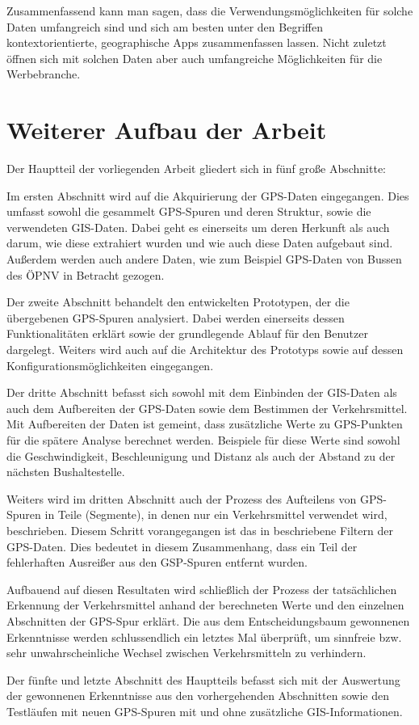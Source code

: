 Zusammenfassend kann man sagen, dass die Verwendungsmöglichkeiten für solche Daten umfangreich sind und sich am besten unter den Begriffen kontextorientierte, geographische Apps zusammenfassen lassen. Nicht zuletzt öffnen sich mit solchen Daten aber auch umfangreiche Möglichkeiten für die Werbebranche.

\section{Weiterer Aufbau der Arbeit}
Der Hauptteil der vorliegenden Arbeit gliedert sich in fünf große Abschnitte:

Im ersten Abschnitt wird auf die Akquirierung der GPS-Daten eingegangen. Dies umfasst sowohl die gesammelt GPS-Spuren und deren Struktur, sowie die verwendeten GIS-Daten. Dabei geht es einerseits um deren Herkunft als auch darum, wie diese extrahiert wurden und wie auch diese Daten aufgebaut sind. Außerdem werden auch andere Daten, wie zum Beispiel GPS-Daten von Bussen des ÖPNV in Betracht gezogen.

Der zweite Abschnitt behandelt den entwickelten Prototypen, der die übergebenen GPS-Spuren analysiert. Dabei werden einerseits dessen Funktionalitäten erklärt sowie der grundlegende Ablauf für den Benutzer dargelegt. Weiters wird auch auf die Architektur des Prototyps sowie auf dessen Konfigurationsmöglichkeiten eingegangen.

Der dritte Abschnitt befasst sich sowohl mit dem Einbinden der GIS-Daten als auch dem Aufbereiten der GPS-Daten sowie dem Bestimmen der Verkehrsmittel. Mit Aufbereiten der Daten ist gemeint, dass zusätzliche Werte zu GPS-Punkten für die spätere Analyse berechnet werden. Beispiele für diese Werte sind sowohl die Geschwindigkeit, Beschleunigung und Distanz als auch der Abstand zu der nächsten Bushaltestelle. 

Weiters wird im dritten Abschnitt auch der Prozess des Aufteilens von GPS-Spuren in Teile (Segmente), in denen nur ein Verkehrsmittel verwendet wird, beschrieben. Diesem Schritt vorangegangen ist das in  beschriebene Filtern der GPS-Daten. Dies bedeutet in diesem Zusammenhang, dass ein Teil der fehlerhaften Ausreißer aus den GSP-Spuren entfernt wurden.

Aufbauend auf diesen Resultaten wird schließlich der Prozess der tatsächlichen Erkennung der Verkehrsmittel anhand der berechneten Werte und den einzelnen Abschnitten der GPS-Spur erklärt. Die aus dem Entscheidungsbaum gewonnenen Erkenntnisse werden schlussendlich ein letztes Mal überprüft, um sinnfreie bzw. sehr unwahrscheinliche Wechsel zwischen Verkehrsmitteln zu verhindern. 

Der fünfte und letzte Abschnitt des Hauptteils befasst sich mit der Auswertung der gewonnenen Erkenntnisse aus den vorhergehenden Abschnitten sowie den Testläufen mit neuen GPS-Spuren mit und ohne zusätzliche GIS-Informationen.
